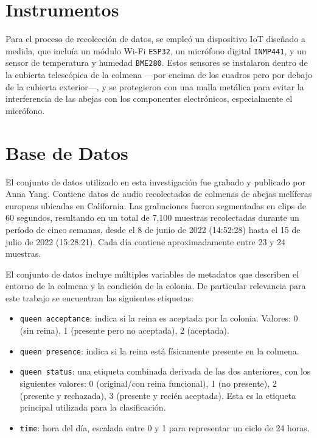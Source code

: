 \documentclass[12pt]{report}
\newenvironment{tightmulticols}{%
  \begin{multicols}{2}
  \setlength{\parskip}{0pt}
  \setlength{\parindent}{0em}
  \linespread{1}\selectfont
}{%
  \end{multicols}
}
\begin{document}
\begin{tightmulticols}
\section{Instrumentos}

\par Para el proceso de recolección de datos, se empleó un dispositivo IoT diseñado a medida, que incluía un módulo Wi-Fi \texttt{ESP32}, un micrófono digital \texttt{INMP441}, y un sensor de temperatura y humedad \texttt{BME280}. Estos sensores se instalaron dentro de la cubierta telescópica de la colmena —por encima de los cuadros pero por debajo de la cubierta exterior—, y se protegieron con una malla metálica para evitar la interferencia de las abejas con los componentes electrónicos, especialmente el micrófono.

\section{Base de Datos}

\par El conjunto de datos utilizado en esta investigación fue grabado y publicado por Anna Yang\cite{AnnaYang-Dataset}. Contiene datos de audio recolectados de colmenas de abejas melíferas europeas ubicadas en California. Las grabaciones fueron segmentadas en clips de 60 segundos, resultando en un total de 7,100 muestras recolectadas durante un período de cinco semanas, desde el 8 de junio de 2022 (14:52:28) hasta el 15 de julio de 2022 (15:28:21). Cada día contiene aproximadamente entre 23 y 24 muestras.

\par El conjunto de datos incluye múltiples variables de metadatos que describen el entorno de la colmena y la condición de la colonia. De particular relevancia para este trabajo se encuentran las siguientes etiquetas:

\begin{itemize}
	\item[\ding{43}] \texttt{queen acceptance}: indica si la reina es aceptada por la colonia. Valores: 0 (sin reina), 1 (presente pero no aceptada), 2 (aceptada).
	\item[\ding{43}] \texttt{queen presence}: indica si la reina está físicamente presente en la colmena.
	\item[\ding{43}] \texttt{queen status}: una etiqueta combinada derivada de las dos anteriores, con los siguientes valores: 0 (original/con reina funcional), 1 (no presente), 2 (presente y rechazada), 3 (presente y recién aceptada). Esta es la etiqueta principal utilizada para la clasificación.
	\item[\ding{43}] \texttt{time}: hora del día, escalada entre 0 y 1 para representar un ciclo de 24 horas.
\end{itemize}


\end{tightmulticols}
\end{document}
